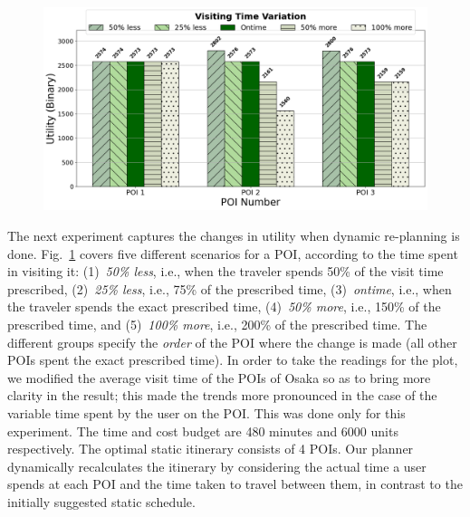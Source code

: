 \begin{figure}[t]
    \centering
    \includegraphics[width=\figwidth]{plots/dynamic_pkj.png}
    \label{fig:dynamic}
\end{figure}

The next experiment captures the changes in utility when dynamic re-planning is done.
Fig.~\ref{fig:dynamic} covers five different scenarios for a POI, according to the time spent in visiting it: (1)~\emph{50\% less}, i.e., when the traveler spends 50\% of the visit time prescribed, (2)~\emph{25\% less}, i.e., 75\% of the prescribed time, (3)~\emph{ontime}, i.e., when the traveler spends the exact prescribed time, (4)~\emph{50\% more}, i.e., 150\% of the prescribed time, and (5)~\emph{100\% more}, i.e., 200\% of the prescribed time.
The different groups specify the \emph{order} of the POI where the change is made (all other POIs spent the exact prescribed time).
In order to take the readings for the plot, we modified the average visit time of the POIs of Osaka so as to bring more clarity in the result; this made the trends more pronounced in the case of the variable time spent by the user on the POI.
This was done only for this experiment.
The time and cost budget are 480 minutes and 6000 units respectively.
The optimal static itinerary consists of 4 POIs.
Our planner dynamically recalculates the itinerary by considering the actual time a user spends at each POI and the time taken to travel between them, in contrast to the initially suggested static schedule.

